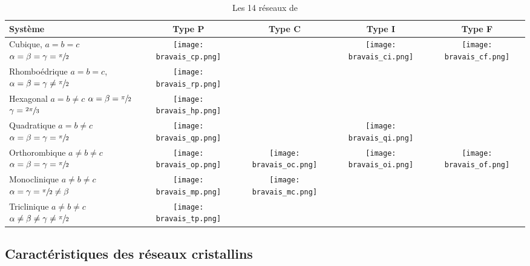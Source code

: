 \begin{table}
    \footnotesize
    \begin{tabulary}{\linewidth}{|p{2.5cm}|c|c|c|c|}
        \hline \textbf{Système} & Type P & Type C & Type I & Type F \\\hline
        Cubique, \mbox{$a = b = c$}
        \mbox{$\alpha = \beta = \gamma = \sfrac{\pi}{2}$} &
        \texttt{[image: bravais\_cp.png]} & & 
        \texttt{[image: bravais\_ci.png]} &
        \texttt{[image: bravais\_cf.png]} 
        \\
        \hline Rhomboédrique $a = b = c$,
        \mbox{$\alpha = \beta = \gamma \neq \sfrac{\pi}{2}$}&
        \texttt{[image: bravais\_rp.png]} & & &
        \\
        \hline Hexagonal $a = b \neq c$
        \mbox{$\alpha = \beta = \sfrac{\pi}{2}$} $\gamma = \sfrac{2\pi}{3}$ &
        \texttt{[image: bravais\_hp.png]} & & &
        \\
        \hline Quadratique $a = b \neq c$
        \mbox{$\alpha = \beta = \gamma = \sfrac{\pi}{2}$} &
        \texttt{[image: bravais\_qp.png]} & &
        \texttt{[image: bravais\_qi.png]} &
        \\
        \hline Orthorombique $a \neq b \neq c$
        \mbox{$\alpha = \beta = \gamma = \sfrac{\pi}{2}$} &
        \texttt{[image: bravais\_op.png]} &
        \texttt{[image: bravais\_oc.png]} &
        \texttt{[image: bravais\_oi.png]} &
        \texttt{[image: bravais\_of.png]}
        \\
        \hline Monoclinique $a \neq b \neq c$
        \mbox{$\alpha=\gamma=\sfrac{\pi}{2} \neq \beta$}
        &
        \texttt{[image: bravais\_mp.png]} &
        \texttt{[image: bravais\_mc.png]} & &
        \\
        \hline Triclinique $a \neq b \neq c$
        \mbox{$\alpha \neq \beta \neq \gamma \neq \sfrac{\pi}{2}$} &
        \texttt{[image: bravais\_tp.png]} & & &
        \\
        \hline
    \end{tabulary}
    \caption{Les 14 réseaux de }\label{tab:bravais}
\end{table}

\subsection{Caractéristiques des réseaux cristallins}
